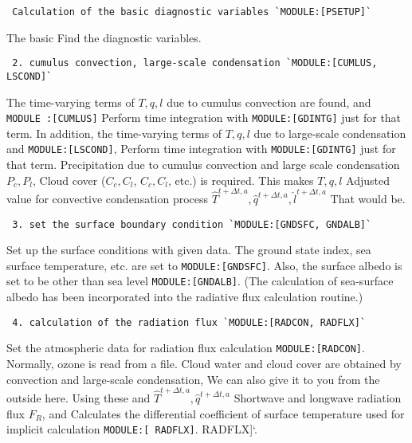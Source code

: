 \begin{verbatim}
 Calculation of the basic diagnostic variables `MODULE:[PSETUP]`
\end{verbatim}

The basic Find the diagnostic variables.

\begin{verbatim}
 2. cumulus convection, large-scale condensation `MODULE:[CUMLUS, LSCOND]`
\end{verbatim}

The time-varying terms of \(T, q, l\) due to cumulus convection are
found, and \texttt{MODULE\ :{[}CUMLUS{]}} Perform time integration with
\texttt{MODULE:{[}GDINTG{]}} just for that term. In addition, the
time-varying terms of \(T, q, l\) due to large-scale condensation and
\texttt{MODULE:{[}LSCOND{]}}, Perform time integration with
\texttt{MODULE:{[}GDINTG{]}} just for that term. Precipitation due to
cumulus convection and large scale condensation \(P_c, P_l\), Cloud
cover (\(C_c, C_l\), \(C_c, C_l\), etc.) is required. This makes
\(T, q, l\) Adjusted value for convective condensation process
\(\hat{T}^{t+\Delta t,a}, \hat{q}^{t+\Delta t,a}, \hat{l}^{t+\Delta t,a}\)
That would be.

\begin{verbatim}
 3. set the surface boundary condition `MODULE:[GNDSFC, GNDALB]`
\end{verbatim}

Set up the surface conditions with given data. The ground state index,
sea surface temperature, etc. are set to \texttt{MODULE:{[}GNDSFC{]}}.
Also, the surface albedo is set to be other than sea level
\texttt{MODULE:{[}GNDALB{]}}. (The calculation of sea-surface albedo has
been incorporated into the radiative flux calculation routine.)

\begin{verbatim}
 4. calculation of the radiation flux `MODULE:[RADCON, RADFLX]`
\end{verbatim}

Set the atmospheric data for radiation flux calculation
\texttt{MODULE:{[}RADCON{]}}. Normally, ozone is read from a file. Cloud
water and cloud cover are obtained by convection and large-scale
condensation, We can also give it to you from the outside here. Using
these and \(\hat{T}^{t+\Delta t,a}, \hat{q}^{t+\Delta t,a}\) Shortwave
and longwave radiation flux \(F_R\), and Calculates the differential
coefficient of surface temperature used for implicit calculation
\texttt{MODULE:{[}\ RADFLX{]}}. RADFLX{]}`.

